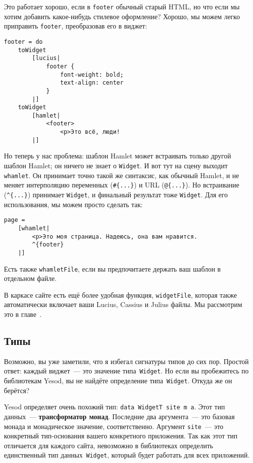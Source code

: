 Это работает хорошо, если в \lstinline'footer' обычный старый HTML, но что если
мы хотим добавить какое-нибудь стилевое оформление? Хорошо, мы можем легко
приправить \lstinline'footer', преобразовав его в виджет:
\begin{lstlisting}
footer = do
    toWidget
        [lucius|
            footer {
                font-weight: bold;
                text-align: center
            }
        |]
    toWidget
        [hamlet|
            <footer>
                <p>Это всё, люди!
        |]
\end{lstlisting}

Но теперь у нас проблема: шаблон Hamlet может встраивать только другой шаблон
Hamlet; он ничего не знает о \lstinline'Widget'. И вот тут на сцену выходит
\lstinline'whamlet'. Он принимает точно такой же синтаксис, как обычный Hamlet,
и не меняет интерполяцию переменных (\lstinline'#{...}')  и URL
(\lstinline'@{...}'). Но встраивание (\lstinline'^{...}') принимает
\lstinline'Widget', и финальный результат тоже \lstinline'Widget'. Для его
использования, мы можем просто сделать так:
\begin{lstlisting}
page =
    [whamlet|
        <p>Это моя страница. Надеюсь, она вам нравится.
        ^{footer}
    |]
\end{lstlisting}

Есть также \lstinline'whamletFile', если вы предпочитаете держать ваш шаблон в
отдельном файле.

\begin{remark}
    В каркасе сайте есть ещё более удобная функция, \lstinline'widgetFile',
    которая также автоматически включает ваши Lucius, Cassius и Julius файлы.
    Мы рассмотрим это в главе~.
\end{remark}

\subsection{Типы}
Возможно, вы уже заметили, что я избегал сигнатуры типов до сих пор. Простой
ответ: каждый виджет~--- это значение типа~\lstinline'Widget'. Но если вы
пробежитесь по библиотекам Yesod, вы не найдёте определение
типа~\lstinline'Widget'. Откуда же он берётся?

Yesod определяет очень похожий тип: \lstinline'data WidgetT site m a'. Этот тип
данных~--- \textbf{трансформатор монад}. Последние два аргумента~--- это
базовая монада и монадическое значение, соответственно. Аргумент
\lstinline'site'~--- это конкретный тип-основания вашего конкретного
приложения. Так как этот тип отличается для каждого сайта, невозможно в
библиотеках определить единственный тип данных~\lstinline'Widget', который будет
работать для всех приложений.

